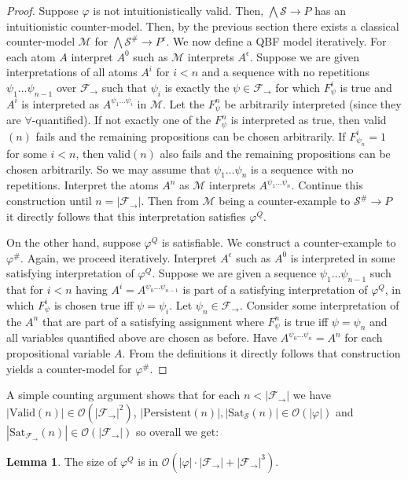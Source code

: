 \documentclass[a4paper,11pt]{report}
\theoremstyle{definition}
\theoremstyle{definition}
\theoremstyle{definition}
\newtheorem{lemma}[theorem]{Lemma}
\theoremstyle{definition}
\theoremstyle{definition}
\theoremstyle{definition}
\theoremstyle{definition}
\begin{document}
	\begin{proof}
		Suppose $\varphi$ is not intuitionistically valid.
		Then, $\bigwedge\mathcal S\to P$ has an intuitionistic counter-model. Then, by the previous section there exists a classical counter-model $\mathcal M$ for $\bigwedge\mathcal S^\#\to P^\epsilon$.
		We now define a QBF model iteratively.
		For each atom $A$ interpret $A^0$ such as $\mathcal M$ interprets $A^\epsilon$. Suppose we are given interpretations of all atoms $A^i$ for $i < n$ and a sequence with no repetitions $\psi_1\dots\psi_{n-1}$ over $\mathcal F_\to$ such that $\psi_i$ is exactly the $\psi\in\mathcal F_\to$ for which $F_{\psi}^i$ is true and $A^i$ is interpreted as $A^{\psi_1\dots\psi_i}$  in $\mathcal M$.
		Let the $F^{n}_\psi$ be arbitrarily interpreted (since they are $\forall$-quantified). If not exactly one of the $F^{n}_\psi$ is interpreted as true, then valid$(n)$ fails and the remaining propositions can be chosen arbitrarily. If $F^i_{\psi_n} = 1$ for some $i < n$, then valid$(n)$ also fails and the remaining propositions can be chosen arbitrarily.
		So we may assume that $\psi_1\dots\psi_n$ is a sequence with no repetitions.
		Interpret the atoms $A^n$ as $\mathcal M$ interprets $A^{\psi_1\dots\psi_n}$.
		Continue this construction until $n  = |\mathcal F_\to|$. Then from $\mathcal M$ being a counter-example to $\mathcal S^\#\to P$ it directly follows that this interpretation satisfies $\varphi^Q$.
		
		On the other hand, suppose $\varphi^Q$ is satisfiable. We construct a counter-example to $\varphi^\#$.
		Again, we proceed iteratively. Interpret $A^\epsilon$ such as $A^0$ is interpreted in some satisfying interpretation of $\varphi^Q$. Suppose we are given a sequence $\psi_1\dots \psi_{n-1}$ such that for $i<n$ having $A^i = A^{\psi_0\dots\psi_{n-1}}$ is part of a satisfying interpretation of $\varphi^Q$, in which $F^i_\psi$ is chosen true iff $\psi = \psi_i$. Let $\psi_n\in\mathcal F_\to$. Consider some interpretation of the $A^n$ that are part of a satisfying assignment where $F^n_\psi$ is true iff $\psi = \psi_n$ and all variables quantified above are chosen as before. Have $A^{\psi_0\dots\psi_n} = A^n$ for each propositional variable $A$. From the definitions it directly follows that construction yields a counter-model for $\varphi^\#$.
	\end{proof}
	
	A simple counting argument shows that for each $n < |\mathcal F_\to|$ we have $|\text{Valid}(n)|\in \mathcal O(|\mathcal F_\to|^2)$, $|\text{Persistent}(n)|, |\text{Sat}_{\mathcal S}(n)|\in \mathcal O(|\varphi|)$ and $|\text{Sat}_{\mathcal F_\to}(n)|\in \mathcal O(|\mathcal F_\to|)$ so overall we get:
	\begin{lemma}
		The size of $\varphi^Q$ is in $\mathcal O(|\varphi|\cdot|\mathcal F_\to| + |\mathcal F_\to|^3)$.
	\end{lemma}
	
\end{document}
